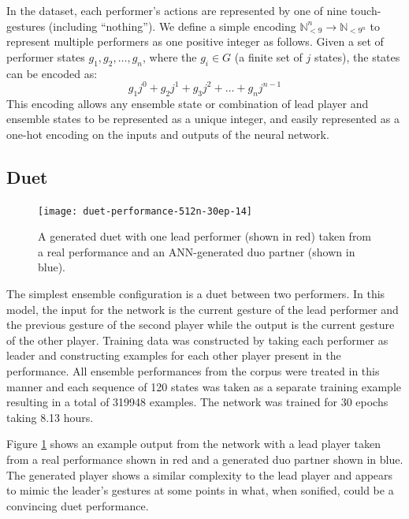 \documentclass{article}
\begin{document}

In the dataset, each performer's actions are represented by one of
nine touch-gestures (including ``nothing''). We define a simple
encoding $\mathbb{N}_{<9}^n \rightarrow \mathbb{N}_{<9^n}$ to
represent multiple performers as one positive integer as follows.
Given a set of performer states $g_1, g_2, \ldots, g_n$, where the
$g_i \in G$ (a finite set of $j$ states), the states can be
encoded as:
\begin{equation}
g_1j^0 + g_2j^1 + g_3j^2 + \ldots + g_nj^{n-1}
\end{equation}
This encoding allows any ensemble state or combination of lead player
and ensemble states to be represented as a unique integer, and easily
represented as a one-hot encoding on the inputs and outputs of the
neural network.

\subsection{Duet}

\begin{figure}
  \centering
  \texttt{[image: duet-performance-512n-30ep-14]}
  \caption{A generated duet with one lead performer (shown in red)
    taken from a real performance and an ANN-generated duo partner
    (shown in blue).}\label{fig:duo-model}
\end{figure}

The simplest ensemble configuration is a duet between two performers.
In this model, the input for the network is the current gesture of the
lead performer and the previous gesture of the second player while the
output is the current gesture of the other player. Training data was
constructed by taking each performer as leader and constructing
examples for each other player present in the performance. All
ensemble performances from the corpus were treated in this manner and
each sequence of 120 states was taken as a separate training example
resulting in a total of 319948 examples. The network was trained for
30 epochs taking 8.13 hours.

Figure \ref{fig:duo-model} shows an example output from the network
with a lead player taken from a real performance shown in red and a
generated duo partner shown in blue. The generated player shows a
similar complexity to the lead player and appears to mimic the
leader's gestures at some points in what, when sonified, could be a
convincing duet performance.
\end{document}
